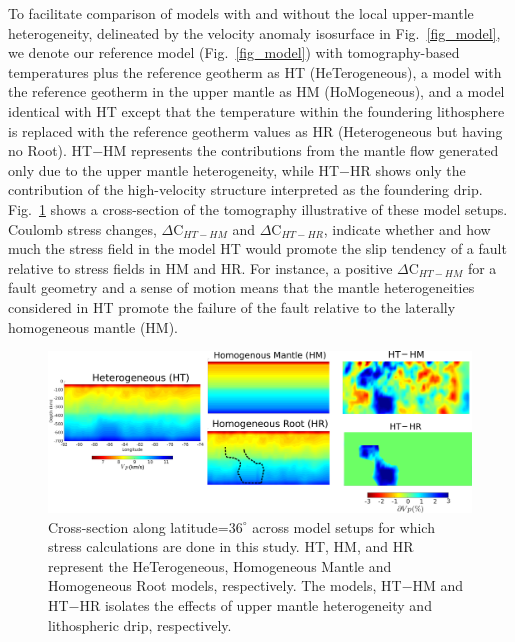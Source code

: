 \documentclass[draft,linenumbers]{agujournal2018}
\begin{document}
To facilitate comparison of models with and without the local upper-mantle heterogeneity, delineated by the velocity anomaly isosurface in Fig.~\ref{fig_model}, we denote our reference model (Fig.~\ref{fig_model}) with tomography-based temperatures plus the reference geotherm as HT (HeTerogeneous), a model with the reference geotherm in the upper mantle as HM (HoMogeneous), and a model identical with HT except that the temperature within the foundering lithosphere is replaced with the reference geotherm values as HR (Heterogeneous but having no Root). HT$-$HM represents the contributions from the mantle flow generated only due to the upper mantle heterogeneity, while HT$-$HR shows only the contribution of the high-velocity structure interpreted as the foundering drip. Fig.~\ref{model_differences} shows a cross-section of the tomography illustrative of these model setups.  Coulomb stress changes, $\Delta$C$_{HT-HM}$ and $\Delta$C$_{HT-HR}$, indicate whether and how much the stress field in the model HT would promote the slip tendency of a fault relative to stress fields in HM and HR. For instance, a positive $\Delta$C$_{HT-HM}$ for a fault geometry and a sense of motion means that the mantle heterogeneities considered in HT promote the failure of the fault relative to the laterally homogeneous mantle (HM). 

\begin{figure}[h!]
    \centering
    \includegraphics[width=\linewidth]{figures/model_differences_updated.png}
    \caption{Cross-section along latitude=$36^\circ$ across model setups for which stress calculations are done in this study. HT, HM, and HR represent the HeTerogeneous, Homogeneous Mantle and Homogeneous Root models, respectively. The models, HT$-$HM and HT$-$HR isolates the effects of upper mantle heterogeneity and lithospheric drip, respectively.}
    \label{model_differences}
\end{figure}
\end{document}
